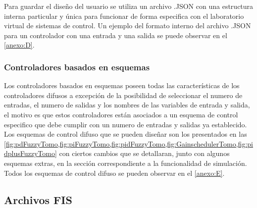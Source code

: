             Para guardar el diseño del usuario se utiliza un archivo .JSON con una estructura interna particular y única para funcionar de forma especifica con el laboratorio virtual de sistemas de control. Un ejemplo del formato interno del archivo .JSON para un controlador con una entrada y una salida se puede observar en el \ref{anexo:D}.

        \subsubsection{Controladores basados en esquemas}

            Los controladores basados en esquemas poseen todas las características de los controladores difusos a excepción de la posibilidad de seleccionar el numero de entradas, el numero de salidas y los nombres de las variables de entrada y salida, el motivo es que estos controladores están asociados a un esquema de control especifico que debe cumplir con un numero de entradas y salidas ya establecido. Los esquemas de control difuso que se pueden diseñar son los presentados en las \cref{fig:pdFuzzyTomo,fig:piFuzzyTomo,fig:pidFuzzyTomo,fig:GainschedulerTomo,fig:pidplusFuzzyTomo} con ciertos cambios que se detallaran, junto con algunos esquemas extras, en la sección correspondiente a la funcionalidad de simulación. Todos los esquemas de control difuso se pueden observar en el \ref{anexo:E}.

    \subsection{Archivos FIS}

